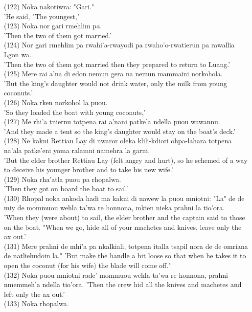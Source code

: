 \documentclass[10pt]{article}
\begin{document}
(122) Noka nakotiwra: "Gari."\\
'He said, "The youngest,"\\
(123) Noka nor gari rmehlim pa.\\
'Then the two of them got married.'\\
(124) Nor gari rmehlim pa rwahi'a-rwayodi pa rwaho'o-rwatierun pa rawallia Lgon wa.\\
'Then the two of them got married then they prepared to return to Luang.'\\
(125) Mere rai a'na di edon nemun gera na nemun mammaini norkohola.\\
'But the king's daughter would not drink water, only the milk from young coconuts.'\\
(126) Noka rken norkohol la puou.\\
'So they loaded the boat with young coconuts,'\\
(127) Me rhi'a tniernu totpena rai a'nani patke'a ndella puou wawannu.\\
'And they made a tent so the king's daughter would stay on the boat's deck.'\\
(128) Ne kakni Rettiau Lay di nwaror oleka klili-kdiori ohpa-lahara totpena na'ala patke'eni yoma ralamni namehra la garni.\\
'But the elder brother Rettiau Lay (felt angry and hurt), so he schemed of a way to deceive his younger brother and to take his new wife.'\\
(129) Noka rha'atla puou pa rhopalwa.\\
'Then they got on board the boat to sail.'\\
(130) Rhopal noka ankoda hadi ma kakni di nawew la puou mniotni: "La" de de miy de mommuou wehla ta'wa re honnona, mkien nieka prahni la tio'ora.\\
'When they (were about) to sail, the elder brother and the captain said to those on the boat, "When we go, hide all of your machetes and knives, leave only the ax out.'\\
(131) Mere prahni de mhi'a pa nkalkiali, totpena italla tsapil nora de de omriana de natliehudoin la." 'But make the handle a bit loose so that when he takes it to open the coconut (for his wife) the blade will come off."\\
(132) Noka puou mniotni rade' mommuou wehla ta'wa re honnona, prahni nmemmeh'a ndella tio'ora. 'Then the crew hid all the knives and machetes and left only the ax out.'\\
(133) Noka rhopalwa.\\
\end{document}
